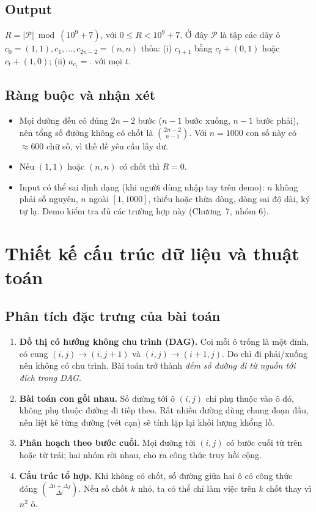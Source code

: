 \documentclass[12pt,a4paper]{report}
\begin{document}
\section{Output}
$R = |\mathcal{P}| \bmod (10^9+7)$, với $0\le R<10^9+7$. Ở đây $\mathcal{P}$ là tập các dãy ô $c_0=(1,1),c_1,\dots,c_{2n-2}=(n,n)$ thỏa:
(i) $c_{t+1}$ bằng $c_t+(0,1)$ hoặc $c_t+(1,0)$; (ii) $a_{c_t}=\texttt{.}$ với mọi $t$.
\section{Ràng buộc và nhận xét}
\begin{itemize}
  \item Mọi đường đều có đúng $2n-2$ bước ($n-1$ bước xuống, $n-1$ bước phải), nên tổng số đường không có chốt là $\binom{2n-2}{n-1}$. Với $n=1000$ con số này có $\approx 600$ chữ số, vì thế đề yêu cầu lấy dư.
  \item Nếu $(1,1)$ hoặc $(n,n)$ có chốt thì $R=0$.
  \item Input có thể sai định dạng (khi người dùng nhập tay trên demo): $n$ không phải số nguyên, $n$ ngoài $[1,1000]$, thiếu hoặc thừa dòng, dòng sai độ dài, ký tự lạ. Demo kiểm tra đủ các trường hợp này (Chương~7, nhóm 6).
\end{itemize}

\chapter{Thiết kế cấu trúc dữ liệu và thuật toán}
\section{Phân tích đặc trưng của bài toán}
\begin{enumerate}
  \item \textbf{Đồ thị có hướng không chu trình (DAG).} Coi mỗi ô trống là một đỉnh, có cung $(i,j)\to(i,j+1)$ và $(i,j)\to(i+1,j)$. Do chỉ đi phải/xuống nên không có chu trình. Bài toán trở thành \emph{đếm số đường đi từ nguồn tới đích trong DAG}.
  \item \textbf{Bài toán con gối nhau.} Số đường tới ô $(i,j)$ chỉ phụ thuộc vào ô đó, không phụ thuộc đường đi tiếp theo. Rất nhiều đường dùng chung đoạn đầu, nên liệt kê từng đường (vét cạn) sẽ tính lặp lại khối lượng khổng lồ.
  \item \textbf{Phân hoạch theo bước cuối.} Mọi đường tới $(i,j)$ có bước cuối từ trên hoặc từ trái; hai nhóm rời nhau, cho ra công thức truy hồi cộng.
  \item \textbf{Cấu trúc tổ hợp.} Khi không có chốt, số đường giữa hai ô có công thức đóng $\binom{\Delta i+\Delta j}{\Delta i}$. Nếu số chốt $k$ nhỏ, ta có thể chỉ làm việc trên $k$ chốt thay vì $n^2$ ô.
\end{enumerate}
\end{document}
